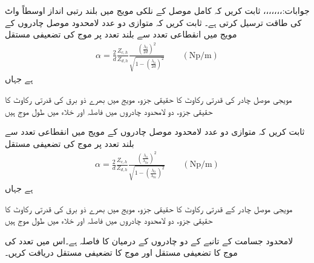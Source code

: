 جوابات:،،،،،،،
ثابت کریں کہ کامل موصل کے نلکی مویج میں  بلند رتبی انداز اوسطاً  واٹ کی طاقت ترسیل کرتی ہے۔
ثابت کریں کہ متوازی دو عدد لامحدود موصل چادروں کے مویج میں انقطاعی تعدد سے بلند تعدد پر  موج کی تضعیفی مستقل
\begin{align*}
 \alpha=\frac{2}{d}\frac{Z_{c,h}}{Z_{d,h}}\frac{\left(\frac{\lambda_0}{2d}\right)^2}{\sqrt{1-\left(\frac{\lambda_0}{2d}\right)^2}} \quad \quad (\si{\neper/ \meter})
\end{align*}
 ہے جہاں
\begin{description}
 مویجی موصل چادر کی قدرتی رکاوٹ کا حقیقی جزو،
 مویج میں بھرے ذو برق کی قدرتی رکاوٹ کا حقیقی جزو،
 دو لامحدود چادروں میں فاصلہ اور
 خلاء میں طول موج ہیں
\end{description}
ثابت کریں کہ متوازی دو عدد لامحدود موصل چادروں کے مویج میں انقطاعی تعدد سے بلند تعدد پر  موج کی تضعیفی مستقل
\begin{align*}
 \alpha=\frac{2}{d}\frac{Z_{c,h}}{Z_{d,h}}\frac{\left(\frac{\lambda_0}{\lambda_{0c}}\right)^2}{\sqrt{1-\left(\frac{\lambda_0}{\lambda_{0c}}\right)^2}} \quad \quad (\si{\neper/ \meter})
\end{align*}
 ہے جہاں
\begin{description}
 مویجی موصل چادر کے قدرتی رکاوٹ کا حقیقی جزو،
 مویج میں بھرے ذو برق کی قدرتی رکاوٹ کا حقیقی جزو،
 دو لامحدود چادروں میں فاصلہ اور
 خلاء میں طول موج ہیں
\end{description}
لامحدود جسامت کے تانبے کے دو چادروں کے درمیان  کا فاصلہ ہے۔اس میں  تعدد کی  موج کا تضعیفی مستقل اور  موج  کا تضعیفی مستقل دریافت کریں۔ 

